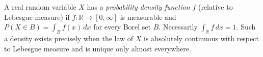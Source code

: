 
A real random variable $X$ has a \emph{probability density function} $f$ (relative to Lebesgue measure) if $f:\mathbb R\to[0,\infty]$ is measurable and $P(X\in B)=\int_B f(x)\,dx$ for every Borel set $B$. Necessarily $\int_{\mathbb R}f\,dx=1$. Such a density exists precisely when the law of $X$ is absolutely continuous with respect to Lebesgue measure and is unique only almost everywhere.
